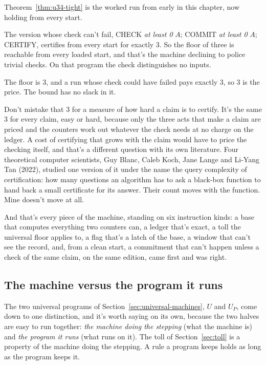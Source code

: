 \documentclass[11pt,twoside]{article}
\theoremstyle{thielethm}
\theoremstyle{thieledef}
\theoremstyle{thieledef}
\theoremstyle{thieledef}
\theoremstyle{thielethm}
\theoremstyle{thieleobs}
\theoremstyle{thielethm}
\begin{document}
Theorem~\ref{thm:u34-tight} is the worked run from early in this chapter, now holding from every start.

The version whose check can't
fail, CHECK \emph{at least 0} $A$; COMMIT \emph{at least 0} $A$; CERTIFY, certifies from every
start for exactly 3. So the
floor of three is reachable from every loaded start, and that's the machine declining to police
trivial checks. On that program the check distinguishes no inputs.

The floor is 3, and a
run whose check could have failed pays exactly 3, so 3 is the price. The bound has no slack
in it.

Don't mistake that 3 for a measure of how hard a claim is to certify. It's the same 3 for every
claim, easy or hard, because only the three acts that make a claim are priced and the counters
work out whatever the check needs at no charge on the ledger. A cost of certifying that grows with the claim
would have to price the checking itself, and that's a different question with its own
literature. Four theoretical computer scientists, Guy Blanc, Caleb Koch, Jane Lange and Li-Yang Tan (2022), studied one version of it
under the name the query complexity of certification: how many questions an algorithm has to
ask a black-box function to hand back a small certificate for its answer. Their count moves
with the function. Mine doesn't move at all.

And that's every piece of the machine, standing on six instruction kinds: a base that computes
everything two counters can, a ledger that's exact, a toll the universal floor applies to, a
flag that's a latch of the base, a window that can't see the record, and, from a clean start, a commitment that can't
happen unless a check of the same claim,
on the same edition, came first and was right.

\subsection{The machine versus the program it runs}
\label{sec:machine-vs-program}

The two universal programs of Section~\ref{sec:universal-machines}, $U$ and $U_P$, come down to one distinction, and it's worth saying on its own,
because the two halves are easy to run together: \emph{the machine doing the stepping} (what the
machine is) and \emph{the program it runs} (what runs on it). The toll of Section~\ref{sec:toll}
is a property of the machine doing the stepping. A rule a program keeps holds as long as the
program keeps it.
\end{document}
